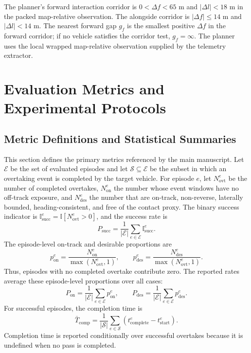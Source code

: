 \documentclass[journal]{IEEEtran}
\begin{document}
The planner's forward interaction corridor is
$0<\Delta f<65$ m and $|\Delta l|<18$ m in the packed map-relative
observation. The alongside corridor is $|\Delta f|\le14$ m and
$|\Delta l|<14$ m. The nearest forward gap $g_f$ is the smallest
positive $\Delta f$ in the forward corridor; if no vehicle satisfies
the corridor test, $g_f=\infty$. The planner uses the local wrapped
map-relative observation supplied by the telemetry extractor.

\section{Evaluation Metrics and Experimental Protocols}
\label{supp:metrics_protocols}

\subsection{Metric Definitions and Statistical Summaries}
\label{supp:metric_definitions}

This section defines the primary metrics referenced by the main
manuscript. Let $\mathcal{E}$ be the set of evaluated episodes and let
$\mathcal{S}\subseteq\mathcal{E}$ be the subset in which an overtaking
event is completed by the target vehicle. For episode $e$, let $N_{\mathrm{ovt}}^e$ be the number of
completed overtakes, $N_{\mathrm{on}}^e$ the number whose event windows
have no off-track exposure, and $N_{\mathrm{des}}^e$ the number that
are on-track, non-reverse, laterally bounded, heading-consistent, and
free of the contact proxy. The binary success indicator is
$\mathbb{I}_{\mathrm{succ}}^e=\mathbb{I}[N_{\mathrm{ovt}}^e>0]$,
and the success rate is
\begin{equation}
P_{\mathrm{succ}}
=
\frac{1}{|\mathcal{E}|}
\sum_{e\in\mathcal{E}}
\mathbb{I}_{\mathrm{succ}}^{e}.
\end{equation}
The episode-level on-track and desirable proportions are
\begin{equation}
p_{\mathrm{on}}^e
=
\frac{N_{\mathrm{on}}^e}{\max(N_{\mathrm{ovt}}^e,1)},
\qquad
p_{\mathrm{des}}^e
=
\frac{N_{\mathrm{des}}^e}{\max(N_{\mathrm{ovt}}^e,1)}.
\end{equation}
Thus, episodes with no completed overtake contribute zero. The reported
rates average these episode-level proportions over all cases:
\begin{equation}
P_{\mathrm{on}}
=
\frac{1}{|\mathcal{E}|}
\sum_{e\in\mathcal{E}}p_{\mathrm{on}}^e,
\qquad
P_{\mathrm{des}}
=
\frac{1}{|\mathcal{E}|}
\sum_{e\in\mathcal{E}}p_{\mathrm{des}}^e.
\end{equation}
For successful episodes, the completion time is
\begin{equation}
\bar{T}_{\mathrm{comp}}
=
\frac{1}{|\mathcal{S}|}
\sum_{e\in\mathcal{S}}
(t_{\mathrm{complete}}^{e}-t_{\mathrm{start}}^{e}).
\end{equation}
Completion time is reported conditionally over successful overtakes
because it is undefined when no pass is completed.
\end{document}

